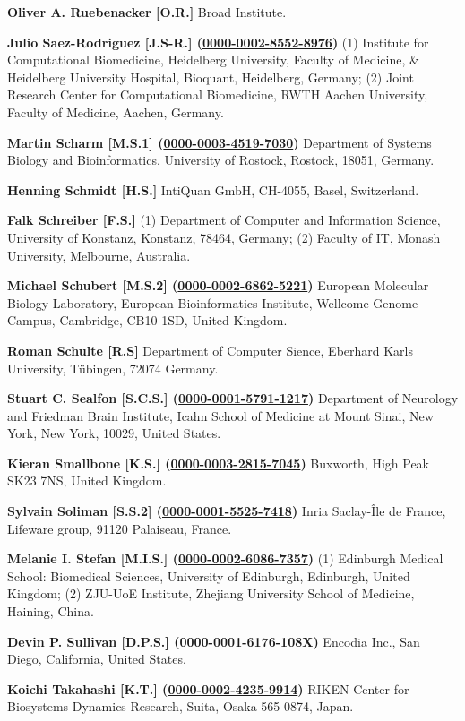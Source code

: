 \documentclass{sbml-paper}
\newcommand{\orcid}[1]{\href{https://orcid.org/#1}{#1}}
\begin{document}
\textbf{Oliver A. Ruebenacker [O.R.]} Broad Institute.

\textbf{Julio Saez-Rodriguez [J.S-R.] (\orcid{0000-0002-8552-8976})} (1) Institute for Computational Biomedicine, Heidelberg University, Faculty of Medicine, \& Heidelberg University Hospital, Bioquant, Heidelberg, Germany; (2) Joint Research Center for Computational Biomedicine, RWTH Aachen University, Faculty of Medicine, Aachen, Germany.

\textbf{Martin Scharm [M.S.1] (\orcid{0000-0003-4519-7030})} Department of Systems Biology and Bioinformatics, University of Rostock, Rostock, 18051, Germany.

\textbf{Henning Schmidt [H.S.]} IntiQuan GmbH, CH-4055, Basel, Switzerland.

\textbf{Falk Schreiber [F.S.]} (1) Department of Computer and Information Science, University of Konstanz, Konstanz, 78464, Germany; (2) Faculty of IT, Monash University, Melbourne, Australia.

\textbf{Michael Schubert [M.S.2] (\orcid{0000-0002-6862-5221})} European Molecular Biology Laboratory, European Bioinformatics Institute, Wellcome Genome Campus, Cambridge, CB10 1SD, United Kingdom.

\textbf{Roman Schulte [R.S]} Department of Computer Sience, Eberhard Karls University, Tübingen, 72074 Germany.

\textbf{Stuart C. Sealfon [S.C.S.] (\orcid{0000-0001-5791-1217})} Department of Neurology and Friedman Brain Institute, Icahn School of Medicine at Mount Sinai, New York, New York, 10029, United States.

\textbf{Kieran Smallbone [K.S.] (\orcid{0000-0003-2815-7045})} Buxworth, High Peak SK23 7NS, United Kingdom.

\textbf{Sylvain Soliman [S.S.2] (\orcid{0000-0001-5525-7418})} Inria Saclay-Île de France, Lifeware group, 91120 Palaiseau, France.

\textbf{Melanie I. Stefan [M.I.S.] (\orcid{0000-0002-6086-7357})} (1) Edinburgh Medical School: Biomedical Sciences, University of Edinburgh, Edinburgh, United Kingdom; (2) ZJU-UoE Institute, Zhejiang University School of Medicine, Haining, China.

\textbf{Devin P. Sullivan [D.P.S.] (\orcid{0000-0001-6176-108X})} Encodia Inc., San Diego, California, United States.

\textbf{Koichi Takahashi [K.T.] (\orcid{0000-0002-4235-9914})} RIKEN Center for Biosystems Dynamics Research, Suita, Osaka 565-0874, Japan.
\end{document}
